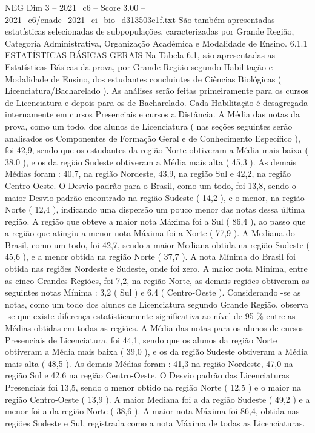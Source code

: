 \begin{textsample}{NEG Dim 3 – 2021\_c6 – Score 3.00 – 2021\_c6/enade\_2021\_ci\_bio\_d313503e1f.txt}
São também apresentadas estatísticas selecionadas de subpopulações, caracterizadas por Grande Região, Categoria Administrativa, Organização Acadêmica e Modalidade de Ensino. 6.1.1 ESTATÍSTICAS BÁSICAS GERAIS Na Tabela 6.1, são apresentadas as Estatísticas Básicas da prova, por Grande Região segundo Habilitação e Modalidade de Ensino, dos estudantes concluintes de Ciências Biológicas ( Licenciatura/Bacharelado ).
As análises serão feitas primeiramente para os cursos de Licenciatura e depois para os de Bacharelado.
Cada Habilitação é desagregada internamente em cursos Presenciais e cursos a Distância.
A Média das notas da prova, como um todo, dos alunos de Licenciatura ( nas seções seguintes serão analisados os Componentes de Formação Geral e de Conhecimento Específico ), foi 42,9, sendo que os estudantes da região Norte obtiveram a Média mais baixa ( 38,0 ), e os da região Sudeste obtiveram a Média mais alta ( 45,3 ).
As demais Médias foram : 40,7, na região Nordeste, 43,9, na região Sul e 42,2, na região Centro-Oeste.
O Desvio padrão para o Brasil, como um todo, foi 13,8, sendo o maior Desvio padrão encontrado na região Sudeste ( 14,2 ), e o menor, na região Norte ( 12,4 ), indicando uma dispersão um pouco menor das notas dessa última região.
A região que obteve a maior nota Máxima foi a Sul ( 86,4 ), ao passo que a região que atingiu a menor nota Máxima foi a Norte ( 77,9 ).
A Mediana do Brasil, como um todo, foi 42,7, sendo a maior Mediana obtida na região Sudeste ( 45,6 ), e a menor obtida na região Norte ( 37,7 ).
A nota Mínima do Brasil foi obtida nas regiões Nordeste e Sudeste, onde foi zero.
A maior nota Mínima, entre as cinco Grandes Regiões, foi 7,2, na região Norte, as demais regiões obtiveram as seguintes notas Mínima : 3,2 ( Sul ) e 6,4 ( Centro-Oeste ).
Considerando -se as notas, como um todo dos alunos de Licenciatura segundo Grande Região, observa -se que existe diferença estatisticamente significativa ao nível de 95 \% entre as Médias obtidas em todas as regiões.
A Média das notas para os alunos de cursos Presenciais de Licenciatura, foi 44,1, sendo que os alunos da região Norte obtiveram a Média mais baixa ( 39,0 ), e os da região Sudeste obtiveram a Média mais alta ( 48,5 ).
As demais Médias foram : 41,3 na região Nordeste, 47,0 na região Sul e 42,6 na região Centro-Oeste.
O Desvio padrão das Licenciaturas Presenciais foi 13,5, sendo o menor obtido na região Norte ( 12,5 ) e o maior na região Centro-Oeste ( 13,9 ).
A maior Mediana foi a da região Sudeste ( 49,2 ) e a menor foi a da região Norte ( 38,6 ).
A maior nota Máxima foi 86,4, obtida nas regiões Sudeste e Sul, registrada como a nota Máxima de todas as Licenciaturas.

\end{textsample}
